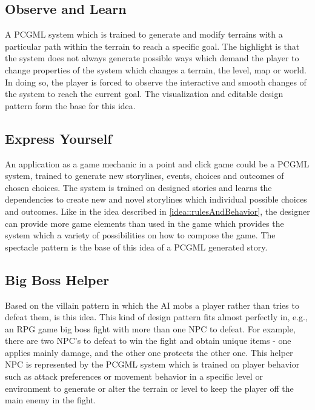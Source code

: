 \documentclass[MGS,Master,english]{twbook}%
\begin{document}
\subsection{Observe and Learn} \label{idea::observeAndLearn}
A PCGML system which is trained to generate and modify terrains with a particular path within the terrain to reach a specific goal. The highlight is that the system does not always generate possible ways which demand the player to change properties of the system which changes a terrain, the level, map or world. In doing so, the player is forced to observe the interactive and smooth changes of the system to reach the current goal. The visualization and editable design pattern form the base for this idea.

\subsection{Express Yourself} \label{idea::expressYourself}
An application as a game mechanic in a point and click game could be a PCGML system, trained to generate new storylines, events, choices and outcomes of chosen choices. The system is trained on designed stories and learns the dependencies to create new and novel storylines which individual possible choices and outcomes. Like in the idea described in \ref{idea::rulesAndBehavior}, the designer can provide more game elements than used in the game which provides the system which a variety of possibilities on how to compose the game. The spectacle pattern is the base of this idea of a PCGML generated story.

\subsection{Big Boss Helper} \label{idea::bigBossHelper}
Based on the villain pattern in which the AI mobs a player rather than tries to defeat them, is this idea. This kind of design pattern fits almost perfectly in, e.g., an RPG game big boss fight with more than one \ac{NPC} to defeat. For example, there are two NPC’s to defeat to win the fight and obtain unique items - one applies mainly damage, and the other one protects the other one. This helper NPC is represented by the PCGML system which is trained on player behavior such as attack preferences or movement behavior in a specific level or environment to generate or alter the terrain or level to keep the player off the main enemy in the fight.
\end{document}
